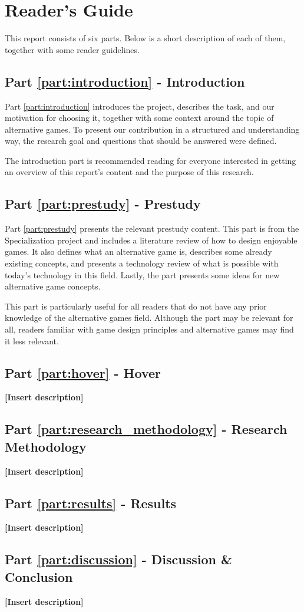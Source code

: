 \section{Reader's Guide}
\label{chap:readers_guide}

This report consists of six parts. Below is a short description of each of them, together with some reader guidelines. 

\subsection*{Part \ref{part:introduction} - Introduction}
Part \ref{part:introduction} introduces the project, describes the task, and our motivation for choosing it, together with some context around the topic of alternative games. To present our contribution in a structured and understanding way, the research goal and questions that should be answered were defined.

The introduction part is recommended reading for everyone interested in getting an overview of this report’s content and the purpose of this research.

\subsection*{Part \ref{part:prestudy} - Prestudy}
Part \ref{part:prestudy} presents the relevant prestudy content. This part is from the Specialization project and includes a literature review of how to design enjoyable games. It also defines what an alternative game is, describes some already existing concepts, and presents a technology review of what is possible with today’s technology in this field. Lastly, the part presents some ideas for new alternative game concepts.

This part is particularly useful for all readers that do not have any prior knowledge of the alternative games field. Although the part may be relevant for all, readers familiar with game design principles and alternative games may find it less relevant.

\subsection*{Part \ref{part:hover} - Hover}
\textbf{[Insert description]}

\subsection*{Part \ref{part:research_methodology} - Research Methodology}
\textbf{[Insert description]}

\subsection*{Part \ref{part:results} - Results}
\textbf{[Insert description]}

\subsection*{Part \ref{part:discussion} - Discussion \& Conclusion}
\textbf{[Insert description]}